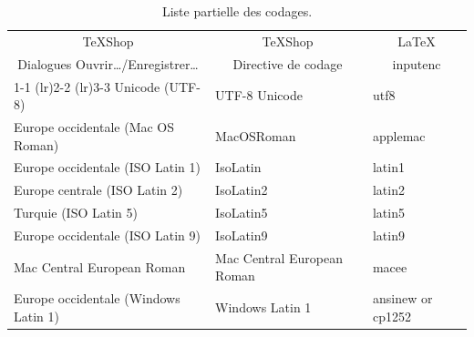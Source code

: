 \documentclass[11pt,french]{article}
\newcommand{\TS}{\textsf{\TeX Shop}}
\begin{document}

\begin{table}[H]
\centering
\begin{tabular}{lll}
\multicolumn{1}{c}{\TS} & \multicolumn{1}{c}{\TS} & \multicolumn{1}{c}{\LaTeX} \\
\multicolumn{1}{c}{Dialogues Ouvrir…/Enregistrer…} & \multicolumn{1}{c}{Directive de codage} & \multicolumn{1}{c}{inputenc} \\
\cmidrule[0.5pt](lr){1-1} \cmidrule[0.5pt](lr){2-2} \cmidrule[0.5pt](lr){3-3}
Unicode (UTF-8) & UTF-8 Unicode & utf8 \\
Europe occidentale (Mac OS Roman) & MacOSRoman & applemac \\
Europe occidentale (ISO Latin 1) & IsoLatin & latin1 \\
Europe centrale (ISO Latin 2) & IsoLatin2 & latin2 \\
Turquie (ISO Latin 5) & IsoLatin5 & latin5 \\
Europe occidentale (ISO Latin 9) & IsoLatin9 & latin9 \\
Mac Central European Roman & Mac Central European Roman & macee \\
Europe occidentale (Windows Latin 1) & Windows Latin 1 & ansinew or cp1252\\
\end{tabular}
\caption{Liste partielle des codages.}\label{tbl:enclist}
\end{table}
\end{document}
